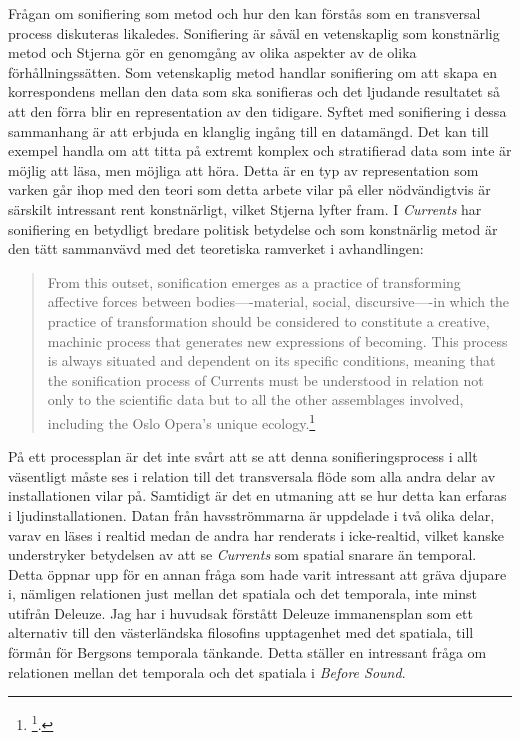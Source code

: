 \documentclass[11pt]{article}
\begin{document}
Frågan om sonifiering som metod och hur den kan förstås som en
transversal process diskuteras likaledes. Sonifiering är såväl en
vetenskaplig som konstnärlig metod och Stjerna gör en genomgång av olika
aspekter av de olika förhållningssätten. Som vetenskaplig metod handlar
sonifiering om att skapa en korrespondens mellan den data som ska
sonifieras och det ljudande resultatet så att den förra blir en
representation av den tidigare. Syftet med sonifiering i dessa
sammanhang är att erbjuda en klanglig ingång till en datamängd. Det kan
till exempel handla om att titta på extremt komplex och stratifierad
data som inte är möjlig att läsa, men möjliga att höra. Detta är en typ
av representation som varken går ihop med den teori som detta arbete
vilar på eller nödvändigtvis är särskilt intressant rent konstnärligt,
vilket Stjerna lyfter fram. I \emph{Currents} har sonifiering en betydligt
bredare politisk betydelse och som konstnärlig metod är den tätt
sammanvävd med det teoretiska ramverket i avhandlingen:

\begin{quote}
From this outset, sonification emerges as a practice of transforming
affective forces between bodies----material, social, discursive----in
which the practice of transformation should be considered to
constitute a creative, machinic process that generates new expressions
of becoming. This process is always situated and dependent on its
specific conditions, meaning that the sonification process of Currents
must be understood in relation not only to the scientific data but to
all the other assemblages involved, including the Oslo Opera's unique
ecology.\footnote{\footcite[s.157]{Stjerna2018}.}
\end{quote}

På ett processplan är det inte svårt att se att denna
sonifieringsprocess i allt väsentligt måste ses i relation till det
transversala flöde som alla andra delar av installationen vilar på.
Samtidigt är det en utmaning att se hur detta kan erfaras i
ljudinstallationen. Datan från havsströmmarna är uppdelade i två olika
delar, varav en läses i realtid medan de andra har renderats i
icke-realtid, vilket kanske understryker betydelsen av att se \emph{Currents}
som spatial snarare än temporal. Detta öppnar upp för en annan fråga som
hade varit intressant att gräva djupare i, nämligen relationen just
mellan det spatiala och det temporala, inte minst utifrån Deleuze. Jag
har i huvudsak förstått Deleuze immanensplan som ett alternativ till den
västerländska filosofins upptagenhet med det spatiala, till förmån för
Bergsons temporala tänkande. Detta ställer en intressant fråga om
relationen mellan det temporala och det spatiala i \emph{Before Sound}.
\end{document}
